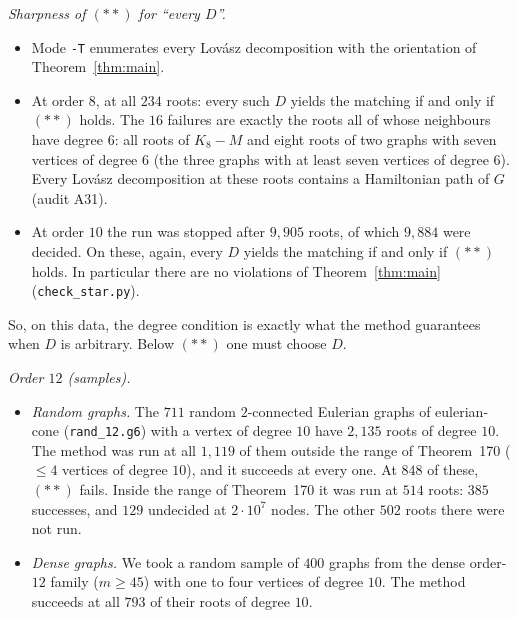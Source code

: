 \documentclass[11pt]{amsart}
\theoremstyle{definition}
\begin{document}
\emph{Sharpness of $(\ast\ast)$ for ``every $D$''.}
\begin{itemize}[leftmargin=*]
\item Mode \texttt{-T} enumerates every Lov\'asz decomposition with the orientation of
Theorem~\ref{thm:main}.
\item At order $8$, at all $234$ roots: every such $D$ yields the matching if and only if $(\ast\ast)$
holds. The $16$ failures are exactly the roots all of whose neighbours have degree $6$: all roots of
$K_8-M$ and eight roots of two graphs with seven vertices of degree $6$ (the three graphs with at least
seven vertices of degree $6$). Every Lov\'asz decomposition at these roots contains a Hamiltonian path
of $G$ (audit A31).
\item At order $10$ the run was stopped after $9{,}905$ roots, of which $9{,}884$ were decided. On these,
again, every $D$ yields the matching if and only if $(\ast\ast)$ holds. In particular there are no
violations of Theorem~\ref{thm:main} (\texttt{check\_star.py}).
\end{itemize}
So, on this data, the degree condition is exactly what the method guarantees when $D$ is arbitrary.
Below $(\ast\ast)$ one must choose $D$.

\emph{Order $12$ (samples).}
\begin{itemize}[leftmargin=*]
\item \emph{Random graphs.} The $711$ random $2$-connected Eulerian graphs of eulerian-cone
(\texttt{rand\_12.g6}) with a vertex of degree $10$ have $2{,}135$ roots of degree $10$. The method was
run at all $1{,}119$ of them outside the range of Theorem~170 ($\le4$ vertices of degree $10$), and it
succeeds at every one. At $848$ of these, $(\ast\ast)$ fails. Inside the range of Theorem~170 it was
run at $514$ roots: $385$ successes, and $129$ undecided at $2\cdot10^7$ nodes. The other $502$ roots
there were not run.
\item \emph{Dense graphs.} We took a random sample of $400$ graphs from the dense order-$12$ family
($m\ge45$) with one to four vertices of degree $10$. The method succeeds at all $793$ of their roots
of degree $10$.
\end{itemize}
\end{document}

